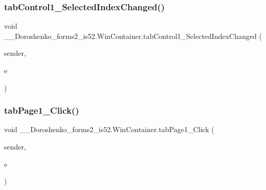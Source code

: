 \subsubsection{\texorpdfstring{tab\+Control1\+\_\+\+Selected\+Index\+Changed()}{tabControl1\_SelectedIndexChanged()}}
{\footnotesize\ttfamily void \+\_\+\_\+\+Doroshenko\+\_\+forms2\+\_\+is52.\+Win\+Container.\+tab\+Control1\+\_\+\+Selected\+Index\+Changed (\begin{DoxyParamCaption}\item[{object}]{sender,  }\item[{Event\+Args}]{e }\end{DoxyParamCaption})\hspace{0.3cm}{\ttfamily [private]}}

\hypertarget{class__7___doroshenko__forms2__is52_1_1_win_container_af661b89123cbc53d5c01329051b1a388}{}\label{class__7___doroshenko__forms2__is52_1_1_win_container_af661b89123cbc53d5c01329051b1a388} 
\subsubsection{\texorpdfstring{tab\+Page1\+\_\+\+Click()}{tabPage1\_Click()}}
{\footnotesize\ttfamily void \+\_\+\_\+\+Doroshenko\+\_\+forms2\+\_\+is52.\+Win\+Container.\+tab\+Page1\+\_\+\+Click (\begin{DoxyParamCaption}\item[{object}]{sender,  }\item[{Event\+Args}]{e }\end{DoxyParamCaption})\hspace{0.3cm}{\ttfamily [private]}}

\hypertarget{class__7___doroshenko__forms2__is52_1_1_win_container_af271aa1fe9946ebf1459cc9b90d07307}{}\label{class__7___doroshenko__forms2__is52_1_1_win_container_af271aa1fe9946ebf1459cc9b90d07307} 
